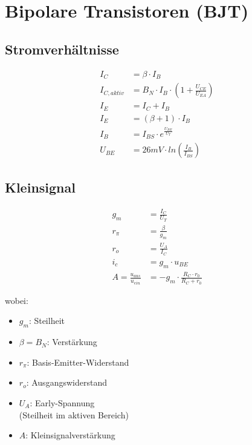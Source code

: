 \documentclass{article}
\begin{document}
\section*{Bipolare Transistoren (BJT)}
\begin{minipage}[t]{0.33\textwidth}
    \subsection*{Stromverhältnisse}
        \begin{align*}
            I_C &= \beta \cdot I_B \\
            I_{C,aktiv} &= B_N\cdot I_B\cdot(1+\frac{U_{CE}}{U_{EA}})\\
            I_E &= I_C + I_B \\
            I_E &= (\beta + 1) \cdot I_B\\
            I_B &= I_{BS}\cdot e^{\frac{U_{BE}}{U_T}}\\
            U_{BE} &= 26mV\cdot ln(\frac{I_B}{I_{BS}})
        \end{align*}
    \end{minipage}
    \begin{minipage}[t]{0.33\textwidth}    
    \subsection*{Kleinsignal}
        \begin{align*}
            g_m &= \frac{I_C}{U_T} \\
            r_\pi &= \frac{\beta}{g_m} \\
            r_o &= \frac{U_A}{I_C}\\
            i_c &= g_m\cdot u_{BE}\\
            A = \frac{u_{aus}}{u_{ein}} &= -g_m\cdot \frac{R_C\cdot r_0}{R_C + r_0}
        \end{align*}
    \end{minipage}
    \begin{minipage}[t]{0.33\textwidth}
    wobei:
    \begin{itemize}
        \item $g_m$: Steilheit
        \item $\beta = B_N$: Verstärkung
        \item $r_\pi$: Basis-Emitter-Widerstand
        \item $r_o$: Ausgangswiderstand
        \item $U_A$: Early-Spannung \\(Steilheit im aktiven Bereich)
        \item $A$: Kleinsignalverstärkung
    \end{itemize}
\end{minipage}
\end{document}

